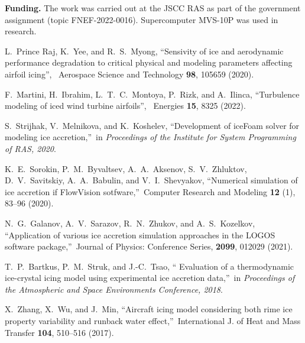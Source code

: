\documentclass[
11pt,
tightenlines,
twoside,
onecolumn,
nofloats,
nobibnotes,
nofootinbib,
superscriptaddress,
noshowpacs,
centertags]
{revtex4-2}
\begin{document}
{\bf Funding.} The work was carried out at the JSCC RAS as part of
the government assignment (topic FNEF-2022-0016). Supercomputer
MVS-10P was used in research.


\begin{thebibliography}{99}

 L.~Prince Raj, K.~Yee, and R.~S.~Myong,
\textquotedblleft Sensivity of  ice and aerodynamic performance
degradation to critical physical and modeling parameters affecting
airfoil icing\textquotedblright, \ Aerospace Science and Technology
{\bf 98}, 105659 (2020).

 F.~Martini, H.~Ibrahim, L.~T.~C.~Montoya, P.~Rizk,
and A.~Ilinca, \textquotedblleft Turbulence  modeling of iced wind
turbine airfoils\textquotedblright, \ Energies {\bf 15}, 8325
(2022).

 S.~Strijhak, V.~Melnikova, and K.~Koshelev,
\textquotedblleft Development of iceFoam  solver for modeling ice
accretion,\textquotedblright \ in \textit{Proceedings of the
Institute for System Programming of RAS, 2020}.

 K.~E.~Sorokin, P.~M.~Byvaltsev, A.~A.~Aksenov,
S.~V.~Zhluktov, D.~V.~Savitskiy, A.~A.~Babulin,  and
V.~I.~Shevyakov, \textquotedblleft Numerical simulation of ice
accretion if FlowVision sotfware,\textquotedblright \ Computer
Research and Modeling {\bf 12} (1), 83--96 (2020).

N.~G.~Galanov, A.~V.~Sarazov, R.~N.~Zhukov, and A.~S.~Kozelkov, \textquotedblleft Application of various ice accretion simulation approaches in the LOGOS software package,\textquotedblright \ Journal of Physics: Conference Series, {\bf 2099}, 012029 (2021).

T.~P.~Bartkus, P.~M.~Struk, and J.-C.~Tsao, \textquotedblleft
Evaluation of  a thermodynamic ice-crystal icing model using
experimental ice accretion data,\textquotedblright \ in
\textit{Proceedings of the Atmospheric and Space Environments
Conference, 2018}.

X.~Zhang, X.~Wu, and J.~Min, \textquotedblleft Aircraft icing  model
considering both rime ice property variability and runback water
effect,\textquotedblright \ International J. of Heat and Mass
Transfer {\bf 104}, 510--516 (2017).


\end{thebibliography}
\end{document}
